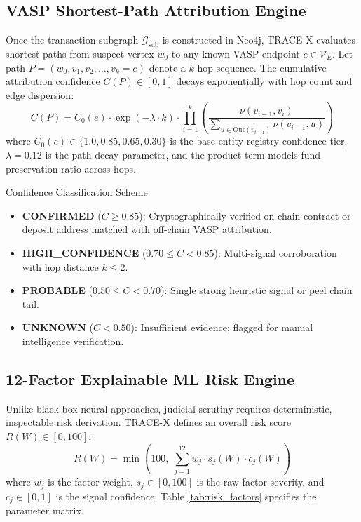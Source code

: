 \documentclass[10pt,twocolumn,a4paper]{article}
\begin{document}
\subsection{VASP Shortest-Path Attribution Engine}
Once the transaction subgraph $\mathcal{G}_{\text{sub}}$ is constructed in Neo4j, TRACE-X evaluates shortest paths from suspect vertex $w_0$ to any known VASP endpoint $e \in \mathcal{V}_E$. Let path $P = (w_0, v_1, v_2, \dots, v_k = e)$ denote a $k$-hop sequence. The cumulative attribution confidence $C(P) \in [0, 1]$ decays exponentially with hop count and edge dispersion:
\begin{equation}
    C(P) = C_0(e) \cdot \exp(-\lambda \cdot k) \cdot \prod_{i=1}^{k} \left( \frac{\nu(v_{i-1}, v_i)}{\sum_{u \in \text{Out}(v_{i-1})} \nu(v_{i-1}, u)} \right)
\end{equation}
where $C_0(e) \in \{1.0, 0.85, 0.65, 0.30\}$ is the base entity registry confidence tier, $\lambda = 0.12$ is the path decay parameter, and the product term models fund preservation ratio across hops.

\begin{infobox}{Confidence Classification Scheme}
\begin{itemize}[leftmargin=*]
    \item \textbf{CONFIRMED} ($C \ge 0.85$): Cryptographically verified on-chain contract or deposit address matched with off-chain VASP attribution.
    \item \textbf{HIGH\_CONFIDENCE} ($0.70 \le C < 0.85$): Multi-signal corroboration with hop distance $k \le 2$.
    \item \textbf{PROBABLE} ($0.50 \le C < 0.70$): Single strong heuristic signal or peel chain tail.
    \item \textbf{UNKNOWN} ($C < 0.50$): Insufficient evidence; flagged for manual intelligence verification.
\end{itemize}
\end{infobox}

\subsection{12-Factor Explainable ML Risk Engine}
Unlike black-box neural approaches, judicial scrutiny requires deterministic, inspectable risk derivation. TRACE-X defines an overall risk score $R(W) \in [0, 100]$:
\begin{equation}
    R(W) = \min\left(100, \; \sum_{j=1}^{12} w_j \cdot s_j(W) \cdot c_j(W)\right)
\end{equation}
where $w_j$ is the factor weight, $s_j \in [0, 100]$ is the raw factor severity, and $c_j \in [0, 1]$ is the signal confidence. Table \ref{tab:risk_factors} specifies the parameter matrix.
\end{document}
